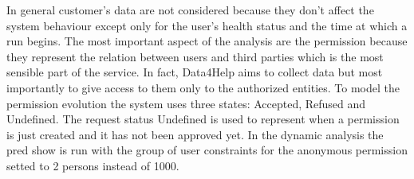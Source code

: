 \documentclass[a4paper]{article}
\begin{document}
In general customer's data are not considered because they don't affect the system behaviour except only for the user's health status and the time at which a run begins. \newline The most important aspect of the analysis are the permission because they represent the relation between users and third parties which is the most sensible part of the service. \newline In fact, Data4Help aims to collect data but most importantly to give access to them only to the authorized entities. \newline
To model the permission evolution the system uses three states: Accepted, Refused and Undefined. \newline
The request status Undefined is used to represent when a permission is just created and it has not been approved yet.
In the dynamic analysis the pred show is run with the group of user constraints for the anonymous permission setted to 2 persons instead of 1000.

\clearpage
\end{document}
